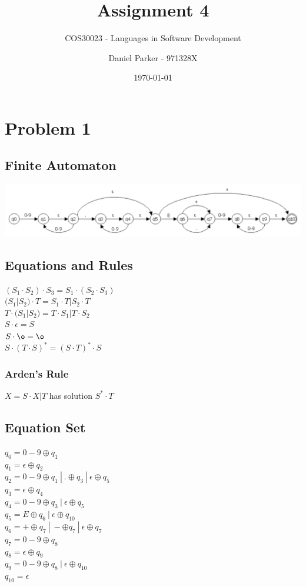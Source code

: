 \documentclass[11pt, numbers=endperiod, parskip=half]{scrartcl}
\title{Assignment 4}
\subtitle{COS30023 - Languages in Software Development}
\author{Daniel Parker - 971328X}
\date{\today}
\begin{document}
\maketitle

\section{Problem 1}
\subsection{Finite Automaton}
\includegraphics[scale=0.4]{automaton.png}

\subsection{Equations and Rules}
\((S_1 \cdot S_2 ) \cdot S_3 = S_1 \cdot (S_2 \cdot S_3)\)\\
\( (S_1 | S_2) \cdot T = S_1 \cdot T | S_2 \cdot T \)\\
\( T \cdot (S_1 | S_2) = T \cdot S_1 | T \cdot S_2 \)\\
\( S \cdot \epsilon = S \)\\
\( S \cdot \o = \o\)\\
\( S \cdot ( T \cdot S )^* = (S \cdot T)^* \cdot S \)

\subsubsection{Arden's Rule}
\(X = S \cdot X | T\) has solution \(S^* \cdot T\)

\subsection{Equation Set}
\(q_0 = 0-9 \oplus q_1\)\\
\(q_1 = \epsilon \oplus q_2\)\\
\(q_2 = 0-9 \oplus q_1\ |\ . \oplus q_3\ |\ \epsilon \oplus q_5 \)\\
\(q_3 = \epsilon \oplus q_4\)\\
\(q_4 = 0-9 \oplus q_3\ |\ \epsilon \oplus q_5\)\\
\(q_5 = E \oplus q_6\ |\ \epsilon \oplus q_{10}\)\\
\(q_6 = + \oplus q_7\ |\ - \oplus q_7\ |\ \epsilon \oplus q_7\)\\
\(q_7 = 0-9 \oplus q_8\)\\
\(q_8 = \epsilon \oplus q_9\)\\
\(q_9 = 0-9 \oplus q_8\ |\ \epsilon \oplus q_{10}\)\\
\(q_{10} = \epsilon\)
\end{document}
